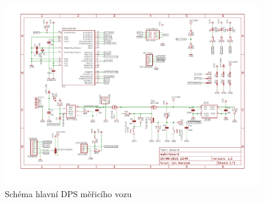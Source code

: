 \begin{figure}[h]
\includegraphics[angle=90,width=1.1\textwidth]{data/wsm_main_board_v1_3.pdf}
\caption{Schéma hlavní DPS měřicího vozu}
\label{fig:wsm-sch}
\end{figure}
